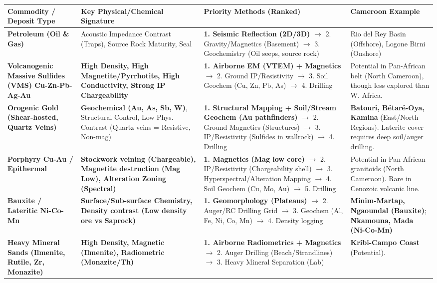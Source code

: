 \documentclass[11pt]{article}
\begin{document}
\begin{center}
\begin{tabularx}{\linewidth}{|l|X|X|X|}\hline
\rowcolor{popblueL} \textbf{Commodity / Deposit Type} & \textbf{Key Physical/Chemical Signature} & \textbf{Priority Methods (Ranked)} & \textbf{Cameroon Example} \\ \hline
\textbf{Petroleum (Oil \& Gas)} & Acoustic Impedance Contrast (Traps), Source Rock Maturity, Seal & \textbf{1. Seismic Reflection (2D/3D)} $\to$ 2. Gravity/Magnetics (Basement) $\to$ 3. Geochemistry (Oil seeps, source rock) & Rio del Rey Basin (Offshore), Logone Birni (Onshore) \\ \hline
\textbf{Volcanogenic Massive Sulfides (VMS) Cu-Zn-Pb-Ag-Au} & \textbf{High Density, High Magnetite/Pyrrhotite, High Conductivity, Strong IP Chargeability} & \textbf{1. Airborne EM (VTEM) + Magnetics} $\to$ 2. Ground IP/Resistivity $\to$ 3. Soil Geochem (Cu, Zn, Pb, As) $\to$ 4. Drilling & Potential in Pan-African belt (North Cameroon), though less explored than W. Africa. \\ \hline
\textbf{Orogenic Gold (Shear-hosted, Quartz Veins)} & \textbf{Geochemical (Au, As, Sb, W)}, Structural Control, Low Phys. Contrast (Quartz veins = Resistive, Non-mag) & \textbf{1. Structural Mapping + Soil/Stream Geochem (Au pathfinders)} $\to$ 2. Ground Magnetics (Structures) $\to$ 3. IP/Resistivity (Sulfides in wallrock) $\to$ 4. Drilling & \textbf{Batouri, Bétaré-Oya, Kamina} (East/North Regions). Laterite cover requires deep soil/auger drilling. \\ \hline
\textbf{Porphyry Cu-Au / Epithermal} & \textbf{Stockwork veining (Chargeable), Magnetite destruction (Mag Low), Alteration Zoning (Spectral)} & \textbf{1. Magnetics (Mag low core)} $\to$ 2. IP/Resistivity (Chargeability shell) $\to$ 3. Hyperspectral/Alteration Mapping $\to$ 4. Soil Geochem (Cu, Mo, Au) $\to$ 5. Drilling & Potential in Pan-African granitoids (North Cameroon). Rare in Cenozoic volcanic line. \\ \hline
\textbf{Bauxite / Lateritic Ni-Co-Mn} & \textbf{Surface/Sub-surface Chemistry, Density contrast (Low density ore vs Saprock)} & \textbf{1. Geomorphology (Plateaus)} $\to$ 2. Auger/RC Drilling Grid $\to$ 3. Geochem (Al, Fe, Ni, Co, Mn) $\to$ 4. Density logging & \textbf{Minim-Martap, Ngaoundal (Bauxite)}; \textbf{Nkamouna, Mada (Ni-Co-Mn)} \\ \hline
\textbf{Heavy Mineral Sands (Ilmenite, Rutile, Zr, Monazite)} & \textbf{High Density, Magnetic (Ilmenite), Radiometric (Monazite/Th)} & \textbf{1. Airborne Radiometrics + Magnetics} $\to$ 2. Auger Drilling (Beach/Strandlines) $\to$ 3. Heavy Mineral Separation (Lab) & \textbf{Kribi-Campo Coast} (Potential). \\ \hline
\end{tabularx}
\end{center}
\end{document}

